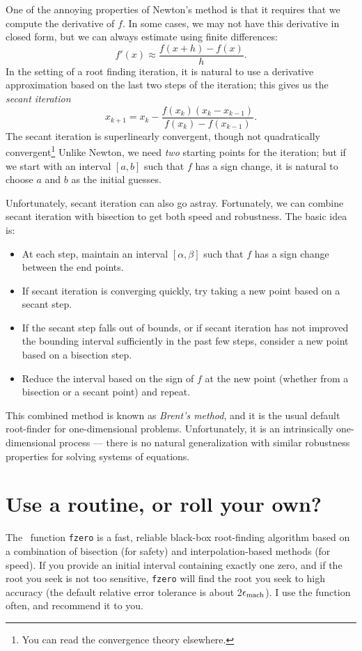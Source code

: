 \documentclass[12pt, leqno]{article}
\begin{document}
One of the annoying properties of Newton's method is that it requires
that we compute the derivative of $f$.  In some cases, we may not have
this derivative in closed form, but we can always estimate using
finite differences:
\[
  f'(x) \approx \frac{f(x+h)-f(x)}{h}.
\]
In the setting of a root finding iteration, it is natural to use a
derivative approximation based on the last two steps of the iteration;
this gives us the {\em secant iteration}
\[
  x_{k+1} = x_k - \frac{f(x_k)(x_k-x_{k-1})}{f(x_{k})-f(x_{k-1})}.
\]
The secant iteration is superlinearly convergent, though not
quadratically convergent\footnote{You can read the convergence
  theory elsewhere.}
Unlike Newton, we need {\em two} starting points for the iteration;
but if we start with an interval $[a,b]$ such that $f$ has a sign
change, it is natural to choose $a$ and $b$ as the initial guesses.

Unfortunately, secant iteration can also go astray.  Fortunately, we
can combine secant iteration with bisection to get both speed and
robustness.  The basic idea is:
\begin{itemize}
\item
  At each step, maintain an interval $[\alpha,\beta]$ such that $f$
  has a sign change between the end points.
\item
  If secant iteration is converging quickly, try taking a new point
  based on a secant step.
\item
  If the secant step falls out of bounds, or if secant iteration has
  not improved the bounding interval sufficiently in the past few
  steps, consider a new point based on a bisection step.
\item
  Reduce the interval based on the sign of $f$ at the new point
  (whether from a bisection or a secant point) and repeat.
\end{itemize}
This combined method is known as {\em Brent's method}, and it is the
usual default root-finder for one-dimensional problems.
Unfortunately, it is an intrinsically one-dimensional process ---
there is no natural generalization with similar robustness properties
for solving systems of equations.

\section*{Use a routine, or roll your own?}


The \matlab\ function {\tt fzero} is a fast, reliable black-box root-finding
algorithm based on a combination of bisection (for safety) and
interpolation-based methods (for speed).  If you provide an initial
interval containing exactly one zero, and if the root you seek is not
too sensitive, {\tt fzero} will find the root you seek to high accuracy
(the default relative error tolerance is about 2$\epsilon_{\mathrm{mach}}$).  I use
the function often, and recommend it to you.
\end{document}
